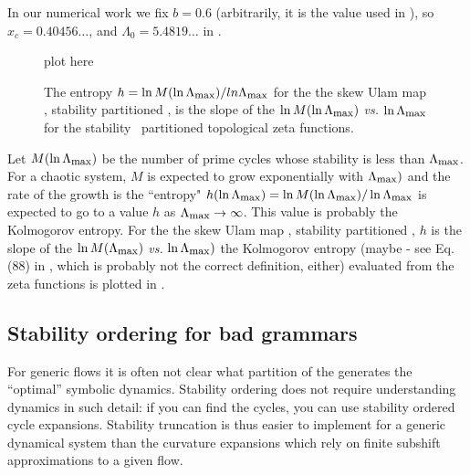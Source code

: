 In our numerical work we fix  $b=0.6$ (arbitrarily,
it is the value used in ), so
$x_c =0.40456\dots$, and $\Lambda_0 = 5.4819\dots$ in
.

\begin{figure}
\begin{center}
plot here %
\end{center}
\caption{
    {\small
The entropy $h = \ln M(\ln \stabCutoff)/ln\stabCutoff$ for the
the skew Ulam map , stability
partitioned \statesp,
is the slope of
the $\ln M(\ln \stabCutoff)$ {\em vs.}
$\ln \stabCutoff$
for the stability \statesp\ partitioned
topological zeta functions.
        }}
\label{fig:logStabOrder1}
\end{figure}

Let $M(\ln \stabCutoff)$ be the number of prime cycles whose
stability is less than $\stabCutoff$. For a chaotic system,
$M$ is expected to grow exponentially with $ \stabCutoff)$ and
the rate of the growth is the
``entropy" $h (\ln\stabCutoff) = \ln M(\ln \stabCutoff)/\ln\stabCutoff$
is expected to go to a value $h$ as $\stabCutoff \to \infty$.
This value is probably the Kolmogorov entropy.
For the
the skew Ulam map , stability
partitioned \statesp,
$h$ is the slope of
the $\ln M(\stabCutoff)$ {\em vs.}
$\ln \stabCutoff)$
the Kolmogorov entropy (maybe - see Eq. (88) in , which
is probably not the correct definition, either) evaluated from
the zeta functions  is plotted in .


\subsection{Stability ordering for bad grammars}

For generic flows it is often not clear what
partition of the {\statesp} generates the ``optimal''
symbolic dynamics.  Stability ordering
does not require understanding dynamics in such detail:
if you can find the cycles, you can use
stability ordered cycle expansions.
Stability truncation
is thus
easier to implement for
a generic dynamical system than the
curvature expansions
which rely on finite subshift approximations
to a given flow.

